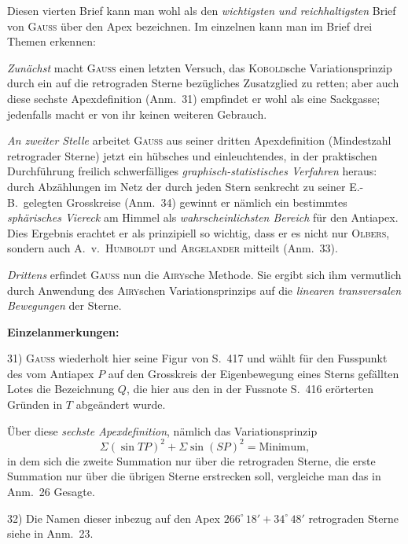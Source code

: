 \documentclass[12pt,a4paper]{article}
\theoremstyle{plain}
\theoremstyle{definition}
\theoremstyle{remark}
\begin{document}
\begin{small}
Diesen vierten Brief kann man wohl als den \textit{wichtigsten und reichhaltigsten} Brief
von \textsc{Gauss} \"uber den Apex bezeichnen. Im einzelnen kann man im Brief drei
Themen erkennen:

\textit{Zun\"achst} macht \textsc{Gauss} einen letzten Versuch, das \textsc{Kobold}sche Variationsprinzip
durch ein auf die retrograden Sterne bez\"ugliches Zusatzglied zu retten; aber auch
diese sechste Apexdefinition (Anm.~31) empfindet er wohl als eine Sackgasse;
jedenfalls macht er von ihr keinen weiteren Gebrauch.

\textit{An zweiter Stelle} arbeitet \textsc{Gauss} aus seiner dritten Apexdefinition (Mindestzahl
retrograder Sterne) jetzt ein h\"ubsches und einleuchtendes, in der praktischen
Durchf\"uhrung freilich schwerf\"alliges \textit{graphisch-statistisches Verfahren} heraus:
durch Abz\"ahlungen im Netz der durch jeden Stern senkrecht zu seiner E.-B.~gelegten
Grosskreise (Anm.~34) gewinnt er n\"amlich ein bestimmtes \textit{sph\"arisches Viereck}
am Himmel als \textit{wahrscheinlichsten Bereich} f\"ur den Antiapex. Dies Ergebnis erachtet
er als prinzipiell so wichtig, dass er es nicht nur \textsc{Olbers}, sondern auch
A.~v.~\textsc{Humboldt} und \textsc{Argelander} mitteilt (Anm.~33).

\textit{Drittens} erfindet \textsc{Gauss} nun die \textsc{Airy}sche Methode. Sie ergibt sich ihm
vermutlich durch Anwendung des \textsc{Airy}schen Variationsprinzips auf die \textit{linearen
transversalen Bewegungen} der Sterne.

\textbf{Einzelanmerkungen:}

31) \textsc{Gauss} wiederholt hier seine Figur von S.~417 und w\"ahlt f\"ur den Fusspunkt
des vom Antiapex $P$ auf den Grosskreis der Eigenbewegung eines Sterns gef\"allten
Lotes die Bezeichnung $Q$, die hier aus den in der Fussnote S.~416 er\"orterten
Gr\"unden in $T$ abge\"andert wurde.

\"Uber diese \textit{sechste Apexdefinition}, n\"amlich das Variationsprinzip
\[\Sigma(\sin TP)^{2} + \Sigma\sin(SP)^{2} = \text{Minimum},\]
in dem sich die zweite Summation nur \"uber die retrograden Sterne, die erste
Summation nur \"uber die \"ubrigen Sterne erstrecken soll, vergleiche man das in
Anm.~26 Gesagte.

32) Die Namen dieser inbezug auf den Apex $266^{\circ}\,18' + 34^{\circ}\,48'$
retrograden Sterne siehe in Anm.~23.


\end{small}
\end{document}
